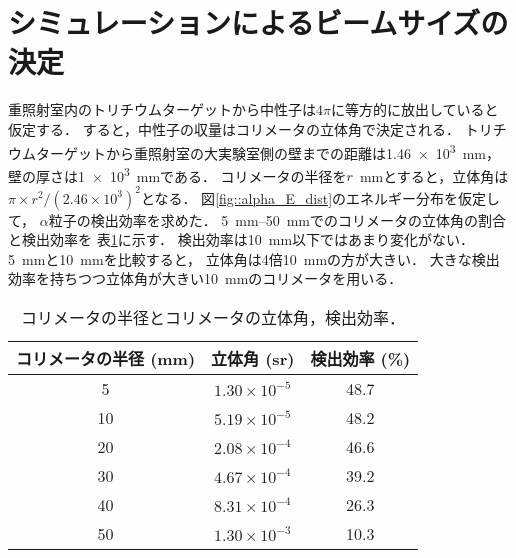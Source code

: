 \documentclass[../master]{subfiles}
\begin{document}
\section{シミュレーションによるビームサイズの決定}
重照射室内のトリチウムターゲットから中性子は$4\pi$に等方的に放出していると仮定する．
すると，中性子の収量はコリメータの立体角で決定される．
トリチウムターゲットから重照射室の大実験室側の壁までの距離は\SI{1.46e3}{\milli\metre}，
壁の厚さは\SI{1e3}{\milli\metre}である．
コリメータの半径を$r$~\si{\milli\metre}とすると，立体角は
$\pi\times r^2/\left(2.46\times10^3\right)^2$となる．
図\ref{fig::alpha_E_dist}のエネルギー分布を仮定して，
$\alpha$粒子の検出効率を求めた．
\SIrange{5}{50}{\milli\metre}でのコリメータの立体角の割合と検出効率を
表\ref{tab::solid_angle_percent}に示す．
検出効率は\SI{10}{\milli\metre}以下ではあまり変化がない．
\SI{5}{\milli\metre}と\SI{10}{\milli\metre}を比較すると，
立体角は4倍\SI{10}{\milli\metre}の方が大きい．
大きな検出効率を持ちつつ立体角が大きい\SI{10}{\milli\metre}のコリメータを用いる．
\begin{table}
  \centering
  \caption{コリメータの半径とコリメータの立体角，検出効率．}
  \label{tab::solid_angle_percent}
  \begin{tabular}{ccc}
    \toprule
    コリメータの半径 (\si{\milli\metre}) & 立体角 (\si{\steradian}) & 検出効率 (\si{\percent})\\%
    \midrule
     5 & $1.30\times10^{-5}$ & 48.7 \\%
    10 & $5.19\times10^{-5}$ & 48.2 \\%
    20 & $2.08\times10^{-4}$ & 46.6 \\%
    30 & $4.67\times10^{-4}$ & 39.2 \\%
    40 & $8.31\times10^{-4}$ & 26.3 \\%
    50 & $1.30\times10^{-3}$ & 10.3 \\%
    \bottomrule
  \end{tabular}
\end{table}
\end{document}
